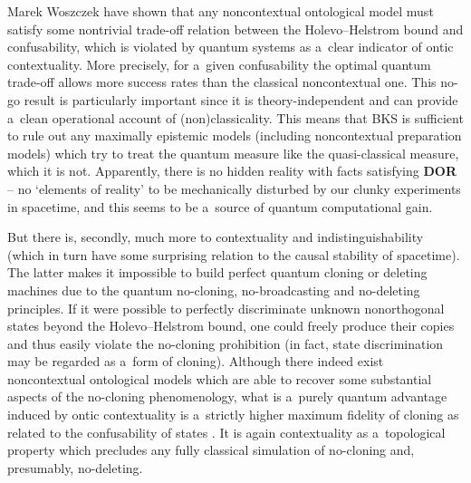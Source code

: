 \begin{artengenv}{Marek Woszczek}
{%
\parencite*[][]{schmid_contextual_2018} %
 have shown that any noncontextual ontological model must satisfy some nontrivial trade-off relation between the Holevo–Helstrom bound and confusability, which is violated by quantum systems as a~clear indicator of ontic contextuality. More precisely, for a~given confusability the optimal quantum trade-off allows more success rates than the classical noncontextual one. This no-go result is particularly important since it is theory-independent and can provide a~clean operational account of (non)classicality. } This means that BKS is sufficient to rule out any maximally epistemic models (including noncontextual preparation models) which try to treat the quantum measure like the quasi-classical measure, which it is not. Apparently, there is no hidden reality with facts satisfying \textbf{DOR} -- no ‘elements of reality' to be mechanically disturbed by our clunky experiments in spacetime, and this seems to be a~source of quantum computational gain.

But there is, secondly, much more to contextuality and indistinguishability (which in turn have some surprising relation to the causal stability of spacetime). The latter makes it impossible to build perfect quantum cloning or deleting machines due to the quantum no-cloning, no-broadcasting and no-deleting principles. If it were possible to perfectly discriminate unknown nonorthogonal states beyond the Holevo–Helstrom bound, one could freely produce their copies and thus easily violate the no-cloning prohibition (in fact, state discrimination may be regarded as a~form of cloning). Although there indeed exist noncontextual ontological models which are able to recover some substantial aspects of the no-cloning phenomenology, what is a~purely quantum advantage induced by ontic contextuality is a~strictly higher maximum fidelity of cloning as related to the confusability of states
\parencite[][]{lostaglio_contextual_2020}. %
 It is again contextuality as a~topological property which precludes any fully classical simulation of no-cloning and, presumably, no-deleting.


\end{artengenv}
